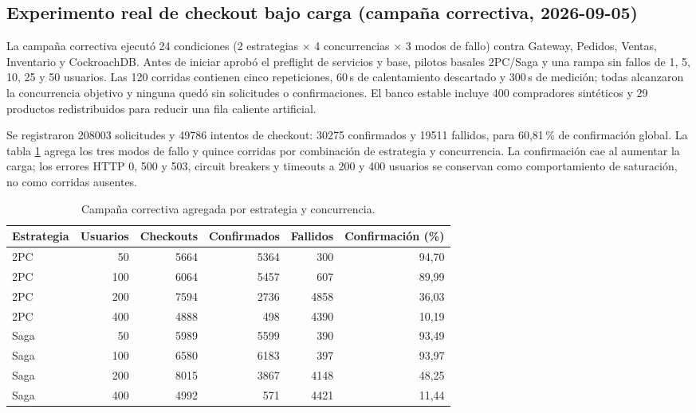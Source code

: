 \documentclass[12pt,a4paper]{article}
\begin{document}
\subsection{Experimento real de checkout bajo carga (campaña correctiva, 2026-09-05)}\label{sec:experimento-real-checkout}
La campaña correctiva ejecutó 24 condiciones (2 estrategias $\times$ 4 concurrencias $\times$ 3 modos de fallo) contra Gateway, Pedidos, Ventas, Inventario y CockroachDB. Antes de iniciar aprobó el preflight de servicios y base, pilotos basales 2PC/Saga y una rampa sin fallos de 1, 5, 10, 25 y 50 usuarios. Las 120 corridas contienen cinco repeticiones, 60\,s de calentamiento descartado y 300\,s de medición; todas alcanzaron la concurrencia objetivo y ninguna quedó sin solicitudes o confirmaciones. El banco estable incluye 400 compradores sintéticos y 29 productos redistribuidos para reducir una fila caliente artificial.

Se registraron 208003 solicitudes y 49786 intentos de checkout: 30275 confirmados y 19511 fallidos, para 60,81\,\% de confirmación global. La tabla \ref{tab:correctiva-agregada} agrega los tres modos de fallo y quince corridas por combinación de estrategia y concurrencia. La confirmación cae al aumentar la carga; los errores HTTP 0, 500 y 503, circuit breakers y timeouts a 200 y 400 usuarios se conservan como comportamiento de saturación, no como corridas ausentes.

{\small\begin{table}[H]\centering
\caption{Campaña correctiva agregada por estrategia y concurrencia.}\label{tab:correctiva-agregada}
\begin{tabular}{lrrrrr}
\toprule Estrategia & Usuarios & Checkouts & Confirmados & Fallidos & Confirmación (\%)\\\midrule
2PC & 50 & 5664 & 5364 & 300 & 94,70\\
2PC & 100 & 6064 & 5457 & 607 & 89,99\\
2PC & 200 & 7594 & 2736 & 4858 & 36,03\\
2PC & 400 & 4888 & 498 & 4390 & 10,19\\
Saga & 50 & 5989 & 5599 & 390 & 93,49\\
Saga & 100 & 6580 & 6183 & 397 & 93,97\\
Saga & 200 & 8015 & 3867 & 4148 & 48,25\\
Saga & 400 & 4992 & 571 & 4421 & 11,44\\\bottomrule
\end{tabular}
\end{table}}
\end{document}
